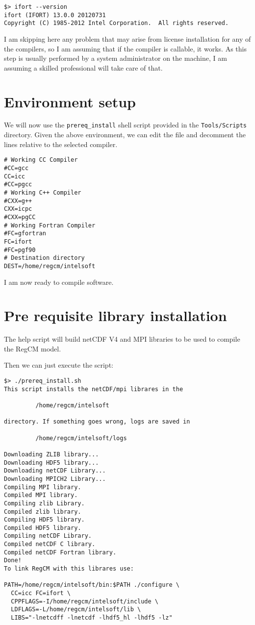 \begin{Verbatim}
$> ifort --version
ifort (IFORT) 13.0.0 20120731
Copyright (C) 1985-2012 Intel Corporation.  All rights reserved.
\end{Verbatim}

I am skipping here any problem that may arise from license installation for any
of the compilers, so I am assuming that if the compiler is callable, it works.
As this step is usually performed by a system administrator on the machine,
I am assuming a skilled professional will take care of that.

\section{Environment setup}

We will now use the \verb=prereq_install= shell script provided in the
\verb=Tools/Scripts= directory. Given the above environment, we can edit
the file and decomment the lines relative to the selected compiler.

\begin{Verbatim}
# Working CC Compiler
#CC=gcc
CC=icc
#CC=pgcc
# Working C++ Compiler
#CXX=g++
CXX=icpc
#CXX=pgCC
# Working Fortran Compiler
#FC=gfortran
FC=ifort
#FC=pgf90
# Destination directory
DEST=/home/regcm/intelsoft
\end{Verbatim}

I am now ready to compile software.

\section{Pre requisite library installation}

The help script will build netCDF V4 and MPI libraries to be used to
compile the RegCM model.

Then we can just execute the script:

\begin{Verbatim}
$> ./prereq_install.sh
This script installs the netCDF/mpi librares in the

         /home/regcm/intelsoft

directory. If something goes wrong, logs are saved in

         /home/regcm/intelsoft/logs

Downloading ZLIB library...
Downloading HDF5 library...
Downloading netCDF Library...
Downloading MPICH2 Library...
Compiling MPI library.
Compiled MPI library.
Compiling zlib Library.
Compiled zlib library.
Compiling HDF5 library.
Compiled HDF5 library.
Compiling netCDF Library.
Compiled netCDF C library.
Compiled netCDF Fortran library.
Done!
To link RegCM with this librares use:

PATH=/home/regcm/intelsoft/bin:$PATH ./configure \
  CC=icc FC=ifort \
  CPPFLAGS=-I/home/regcm/intelsoft/include \
  LDFLAGS=-L/home/regcm/intelsoft/lib \
  LIBS="-lnetcdff -lnetcdf -lhdf5_hl -lhdf5 -lz"

\end{Verbatim}

